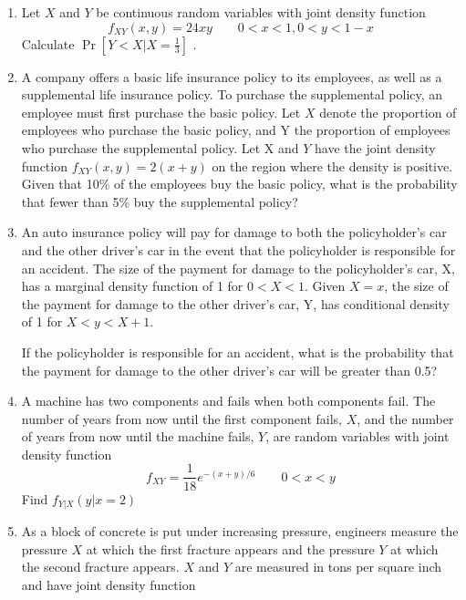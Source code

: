 \documentclass[../main.tex]{subfiles}
\begin{document}
\begin{exercises}
\begin{enumerate}
\item %

Let $X$ and $Y$ be continuous random variables with joint density function
$$f_{XY}(x,y) = 24xy \qquad 0<x<1, 0<y<1-x$$
Calculate $\Pr[ Y < X|X = \frac13]$ .





\item %
A company offers a basic life insurance policy to its employees, as well as a
supplemental life insurance policy. To purchase the supplemental policy, an
employee must first purchase the basic policy.
Let $X$ denote the proportion of employees who purchase the basic policy, and
Y the proportion of employees who purchase the supplemental policy. Let
X and $Y$ have the joint density function $f_{XY}(x,y) = 2(x + y)$ on the region
where the density is positive.
Given that 10\% of the employees buy the basic policy, what is the probability
that fewer than 5\% buy the supplemental policy?



\item %
An auto insurance policy will pay for damage to both the policyholder’s car
and the other driver’s car in the event that the policyholder is responsible
for an accident. The size of the payment for damage to the policyholder’s
car, X, has a marginal density function of 1 for $0 < X < 1$. Given $X = x$, the
size of the payment for damage to the other driver’s car, Y, has conditional
density of 1 for $X < y < X + 1$.

If the policyholder is responsible for an accident, what is the probability that
the payment for damage to the other driver’s car will be greater than 0.5?



\item %
A machine has two components and fails when both components fail. The
number of years from now until the first component fails, $X$, and the number
of years from now until the machine fails, $Y$, are random variables with joint
density function
$$f_{XY} = \dfrac{1}{18}e^{-(x+y)/6} \qquad 0<x<y$$
Find $f_{Y |X}(y|x=2)$


\item %
As a block of concrete is put under increasing pressure, engineers measure the
pressure $X$ at which the first fracture appears and the pressure $Y$ at which
the second fracture appears. $X$ and $Y$ are measured in tons per square inch
and have joint density function


\end{enumerate}
\end{exercises}
\end{document}
